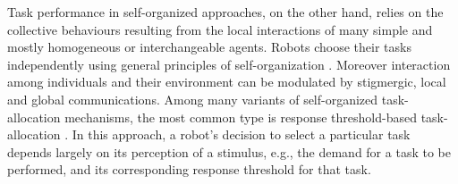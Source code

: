 \documentclass[journal]{IEEEtran}
\begin{document}
Task performance in self-organized approaches, on the other hand, relies on the collective behaviours resulting from the local interactions of many simple and mostly homogeneous or interchangeable agents. Robots choose their tasks independently using general principles of self-organization  
\cite{Camazine+2001}. 
Moreover interaction among individuals and their environment can be modulated by stigmergic, local and global communications.  Among many variants of self-organized task-allocation mechanisms, the most common type is response threshold-based task-allocation \cite{Bonabeau+1999}. In this approach, a robot's decision to select a particular task depends largely on its perception of a stimulus, e.g., the demand for a task to be performed, and its corresponding response threshold for that task.
\end{document}
